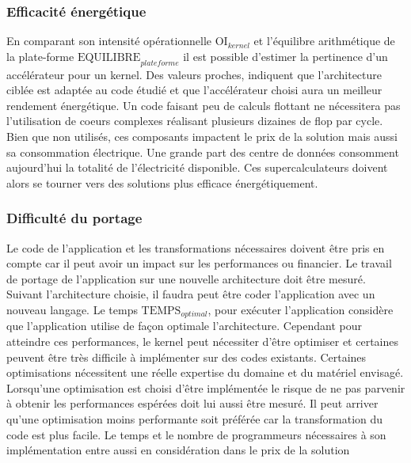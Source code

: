 \subsubsection{Efficacité énergétique}
En comparant son intensité opérationnelle  $\text{OI}_{kernel}$ et l'équilibre arithmétique de la plate-forme $\text{EQUILIBRE}_{plateforme}$ il est possible d'estimer la pertinence d'un accélérateur pour un kernel. Des valeurs proches, indiquent que l'architecture ciblée est adaptée au code étudié et que l'accélérateur choisi aura un meilleur rendement énergétique. Un code faisant peu de calculs flottant ne nécessitera pas l'utilisation de coeurs complexes réalisant plusieurs dizaines de flop par cycle. Bien que non utilisés, ces composants impactent le prix de la solution mais aussi sa consommation électrique. Une grande part des centre de données consomment aujourd'hui la totalité de l'électricité disponible. Ces supercalculateurs doivent alors se tourner vers des solutions plus efficace énergétiquement.


\subsubsection{Difficulté du portage}
Le code de l'application  et les transformations nécessaires doivent être pris en compte car il peut avoir un impact sur les performances ou financier. Le travail de portage de l'application sur une nouvelle architecture doit être mesuré. Suivant l'architecture choisie, il faudra peut être coder l'application avec un nouveau langage. Le temps $\text{TEMPS}_{optimal}$, pour exécuter l'application considère que l'application utilise de façon optimale l'architecture. Cependant pour atteindre ces performances, le kernel peut nécessiter d'être optimiser et certaines peuvent être très difficile à implémenter sur des codes existants. Certaines optimisations nécessitent une réelle expertise du domaine et du matériel envisagé. Lorsqu'une optimisation est choisi d'être implémentée le risque de ne pas parvenir à obtenir les performances espérées doit lui aussi être mesuré. Il peut arriver qu'une optimisation moins performante soit préférée car la transformation du code est plus facile. Le temps et le nombre de programmeurs nécessaires à son implémentation entre aussi en considération dans le prix de la solution


